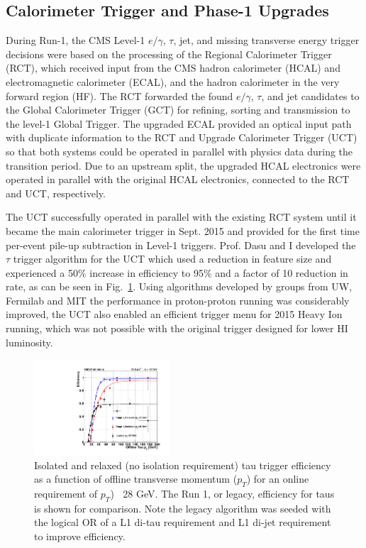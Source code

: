 \documentclass[preprint,12pt]{elsarticle}
\begin{document}
\subsection{Calorimeter Trigger and Phase-1 Upgrades}
During Run-1, the CMS Level-1 $e/\gamma$, $\tau$, jet, and missing transverse energy trigger decisions were based
on the processing of the Regional Calorimeter Trigger (RCT), which received input from the
CMS hadron calorimeter (HCAL) and electromagnetic calorimeter (ECAL), and the hadron calorimeter in
the very forward region (HF). The RCT forwarded the found $e/\gamma$, $\tau$, and jet candidates 
to the Global Calorimeter Trigger (GCT) for refining, sorting and transmission to the level-1 Global Trigger.
The upgraded ECAL provided an optical input path with duplicate information to the RCT and
Upgrade Calorimeter Trigger (UCT) so that both systems could be
operated in parallel with physics data during the transition period. 
Due to an upstream split, the upgraded HCAL electronics were operated in parallel with the original 
HCAL electronics, connected to the RCT and UCT, respectively.

The UCT successfully operated in parallel with the existing RCT system until it became the 
main calorimeter trigger in Sept. 2015 and provided for the first
time per-event pile-up subtraction in Level-1 triggers. 
Prof. Dasu and I developed the $\tau$ trigger algorithm for the UCT which used a reduction in feature size and experienced a 50\% increase in efficiency
to 95\% and a factor of 10 reduction in rate, as can be seen in Fig.~\ref{fig:tau_stage1}.
Using algorithms developed by groups from UW, Fermilab and MIT 
the performance in proton-proton running was considerably improved, the UCT also enabled an efficient trigger menu for 2015 Heavy Ion
running, which was not possible with the original trigger designed for lower HI luminosity.

\begin{figure}[htbp]
    \centering
    \includegraphics[trim=260 60 50 50,clip,width=0.45\textwidth]{TDR_RlxIsoLegacy_28GeV.png}
    \centering \caption{Isolated and relaxed (no isolation requirement) tau trigger efficiency as a 
       function of offline transverse momentum ($p_{T}$) for an online requirement of $p_{T}$) $\>$ 28 GeV. The
       Run 1, or legacy, efficiency for taus is shown for comparison. Note the legacy algorithm
       was seeded with the logical OR of a L1 di-tau requirement and L1 di-jet requirement to improve
       efficiency.}
     \label{fig:tau_stage1}
\end{figure}
\end{document}
